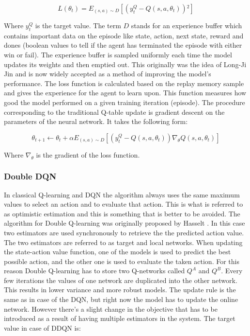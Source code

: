\documentclass[
]{elteikthesis}[2023/04/10]
\begin{document}
\begin{equation}
L(\theta_{t})=E_{(s,a)\sim D}\left[\left(y_{t}^{Q}-Q\left(s,a,\theta_{t}\right)\right){}^{2}\right]
\end{equation}

Where $y_{t}^{Q}$ is the target value. The term $D$ stands for an
experience buffer which contains important data on the episode like
state, action, next state, reward and dones (boolean values to tell if the
agent has terminated the episode with either win or fail). The experience
buffer is sampled uniformly each time the model updates its weights
and then emptied out. This originally was the idea of Long-Ji Jin
\cite{lin1992self} and is now widely accepted as a method of improving
the model's performance. The loss function is calculated based on
the replay memory sample and gives the experience for the agent to learn upon. 
This function measures how good the model performed on a given training
iteration (episode). The procedure corresponding to the traditional
Q-table update is gradient descent on the parameters of the neural
network. It takes the following form:

\begin{equation}
\theta_{t+1}\leftarrow\theta_{t}+\alpha E_{(s,a)\sim D}\left[\left(y_{t}^{Q}-Q\left(s,a,\theta_{t}\right)\right)\nabla_{\theta}Q\left(s,a,\theta_{t}\right)\right]
\end{equation}

Where $\nabla_{\theta}$ is the gradient of the loss function.

\subsubsection*{Double DQN}

In classical Q-learning and DQN the algorithm always uses the same
maximum values to select an action and to evaluate that action. This
is what is referred to as optimistic estimation and this is something
that is better to be avoided. The algorithm for Double Q-learning
was originally proposed by Hasselt \cite{hasselt2010double}. In this
case two estimators are used synchronously to retrieve the the predicted
action value. The two estimators are referred to as target and local
networks. When updating the state-action value function, one of the
models is used to predict the best possible action, and the other
one is used to evaluate the taken action. For this reason Double Q-learning
has to store two Q-networks called $Q^{A}$ and $Q^{B}$. Every few 
iterations the values of one network are duplicated into the other network. 
This results in lower variance and more robust models.
The update rule is the same as in case of the DQN, but right now the
model has to update the online network. However there's a slight change
in the objective that has to be introduced as a result of having multiple 
estimators in the system. The target value in case of DDQN is:
\end{document}

